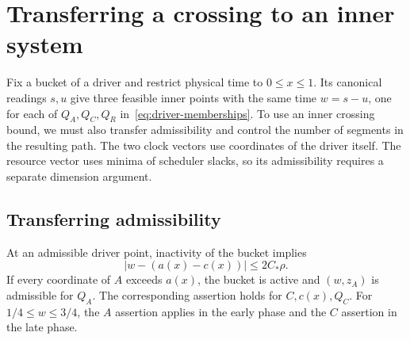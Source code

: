 \section{Transferring a crossing to an inner system}
\label{sec:transfer}

Fix a bucket of a driver and restrict physical time to \(0\le x\le1\).
Its canonical readings \(s,u\) give three feasible inner points with
the same time \(w=s-u\), one for each of \(Q_A,Q_C,Q_R\)
in~\eqref{eq:driver-memberships}. To use an inner crossing bound, we
must also transfer admissibility and control the number of segments
in the resulting path. The two clock vectors use coordinates of the
driver itself. The resource vector uses minima of scheduler slacks,
so its admissibility requires a separate dimension argument.

\subsection{Transferring admissibility}

\begin{lemma}\label{lem:transfer}
At an admissible driver point, inactivity of the bucket implies
\[
                    |w-(a(x)-c(x))|\le 2C_*\rho .
\]
If every coordinate of \(A\) exceeds \(a(x)\), the bucket is active
and \((w,z_A)\) is admissible for \(Q_A\). The corresponding assertion
holds for \(C,c(x),Q_C\). For \(1/4\le w\le3/4\), the \(A\) assertion
applies in the early phase and the \(C\) assertion in the late phase.
\end{lemma}

